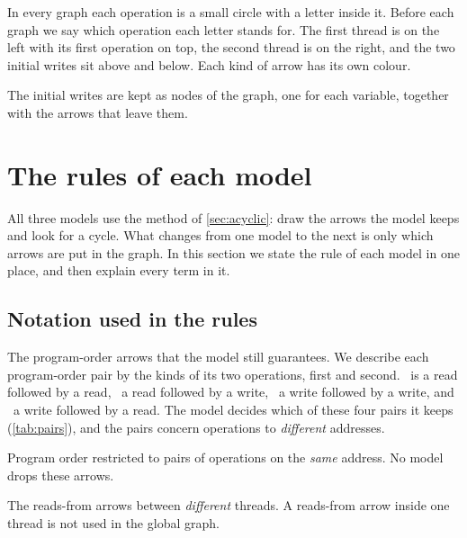 In every graph each operation is a small circle with a letter inside it. Before each graph we say which operation each letter stands for. The first thread is on the left with its first operation on top, the second thread is on the right, and the two initial writes sit above and below. Each kind of arrow has its own colour.
\begin{center}
\end{center}
The initial writes are kept as nodes of the graph, one for each variable, together with the arrows that leave them.

\section{The rules of each model}
\label{sec:rules}

All three models use the method of \cref{sec:acyclic}: draw the arrows the model keeps and look for a cycle. What changes from one model to the next is only which arrows are put in the graph. In this section we state the rule of each model in one place, and then explain every term in it.

\subsection{Notation used in the rules}

\begin{description}[leftmargin=0.9cm, style=nextline]
\item[\ppo\ \normalfont(preserved program order)\index{preserved program order}] The program-order arrows that the model still guarantees. We describe each program-order pair by the kinds of its two operations, first and second. \RR\ is a read followed by a read, \RW\ a read followed by a write, \WW\ a write followed by a write, and \WR\ a write followed by a read. The model decides which of these four pairs it keeps (\cref{tab:pairs}), and the pairs concern operations to \emph{different} addresses.
\item[\poloc\ \normalfont(program order on one address)] Program order restricted to pairs of operations on the \emph{same} address. No model drops these arrows.
\item[\rfe\ \normalfont(external reads-from)] The reads-from arrows between \emph{different} threads. A reads-from arrow inside one thread is not used in the global graph.
\end{description}

